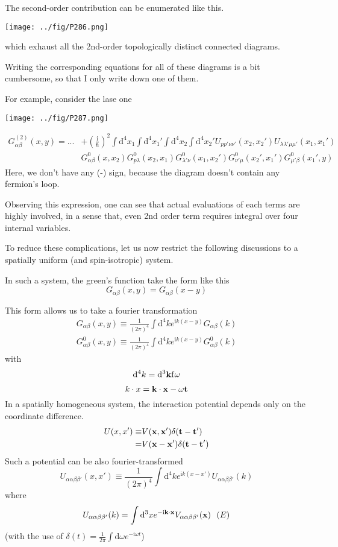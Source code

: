 The second-order contribution can be enumerated like this.
\begin{center}
\texttt{[image: ../fig/P286.png]}
\end{center}
which exhaust all the 2nd-order topologically distinct connected diagrams.

Writing the corresponding equations for all of these diagrams is a bit cumbersome, so that I only write down one of them.

For example, consider the lase one
\begin{center}
\texttt{[image: ../fig/P287.png]}
\end{center}
\begin{align}
G^{(2)}_{\alpha\beta}(x,y)=...&+(\frac{\mathrm{i}}{\hbar})^2\int \mathrm{d}^4x_1\int \mathrm{d}^4x_1'\int \mathrm{d}^4x_2\int \mathrm{d}^4x_2'U_{pp'\nu\nu'}(x_2,x_2')U_{\lambda\lambda'\mu\mu'}(x_1,x_1') \nonumber \\
&G_{\alpha\beta}^0(x,x_2)G_{p\lambda}^0(x_2,x_1)G_{\lambda'\nu}^0(x_1,x_2')G_{\nu'\mu}^0(x_2',x_1')G_{\mu'\beta}^0(x_1',y) \nonumber
\end{align}
Here, we don't have any (-) sign, because the diagram doesn't contain any fermion's loop.

Observing this expression, one can see that actual evaluations of each terms are highly involved, in a sense that, even 2nd order term requires integral over four internal variables.

To reduce these complications, let us now restrict the following discussions to a spatially uniform (and spin-isotropic) system.

In such a system, the green's function take the form like this 
$$G_{\alpha\beta}(x,y)=G_{\alpha\beta}(x-y)$$

This form allows us to take a fourier transformation
\begin{align}\label{2.5.5}
G_{\alpha\beta}(x,y)\equiv\frac{1}{(2\pi)^4}\int \mathrm{d}^4ke^{\mathrm{i}k(x-y)}G_{\alpha\beta}(k) \nonumber \\
G^0_{\alpha\beta}(x,y)\equiv\frac{1}{(2\pi)^4}\int \mathrm{d}^4ke^{\mathrm{i}k(x-y)}G^0_{\alpha\beta}(k)
\end{align}
with
$$\mathrm{d}^4k=\mathrm{d}^3\bf{k}\mathrm{f}\omega$$

$$k\cdot x=\bf{k}\cdot\bf{x}-\omega t$$
In a spatially homogeneous system, the interaction potential depends only on the coordinate difference.
\begin{align}\label{2.5.6}
U(x,x')\equiv& V(\bf{x},\bf{x}')\delta(t-t') \nonumber \\
=& V(\bf{x}-\bf{x}')\delta(t-t')
\end{align}
Such a potential can be also fourier-transformed
$$U_{\alpha\alpha\beta\beta'}(x,x')\equiv \frac{1}{(2\pi)^4}\int \mathrm{d}^4ke^{\mathrm{i}k(x-x')}U_{\alpha\alpha\beta\beta'}(k)$$
where
\begin{align}\label{2.5.7}
U_{\alpha\alpha\beta\beta'}(k)=\int \mathrm{d}^3x e^{-\mathrm{i}\bf{k}\cdot\bf{x}}V_{\alpha\alpha\beta\beta'}({\bf x}) \ \ (E)
\end{align}
(with the use of $\delta(t)=\frac{1}{2\pi}\int \mathrm{d}\omega e^{-\mathrm{i}\omega t}$)

